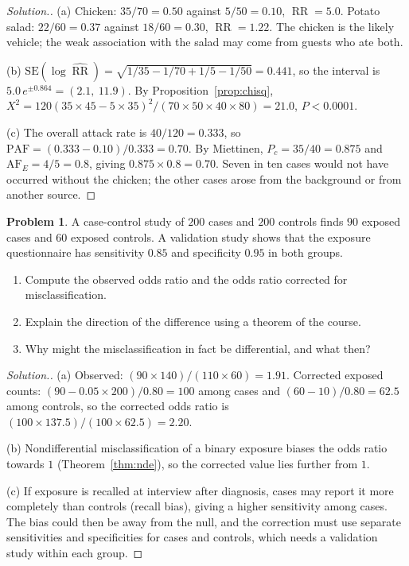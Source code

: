 \documentclass[11pt,a4paper]{article}
\numberwithin{equation}{section}
\DeclareMathOperator{\RR}{RR}
\theoremstyle{definition}
\newtheorem{problemx}{Problem}[subsection]
\newenvironment{problem}{\begin{problemx}}{\end{problemx}}
\newenvironment{solution}
  {\renewcommand{\qedsymbol}{}\begin{proof}[\textit{Solution}.]}
  {\end{proof}}
\begin{document}
\begin{solution}
(a) Chicken: $35/70 = 0.50$ against $5/50 = 0.10$, $\RR = 5.0$. Potato salad: $22/60 = 0.37$ against $18/60 = 0.30$, $\RR = 1.22$. The chicken is the likely
vehicle; the weak association with the salad may come from guests who ate both.

(b) $\text{SE}(\log\widehat{\RR}) = \sqrt{1/35 - 1/70 + 1/5 - 1/50} = 0.441$, so the interval is $5.0\,e^{\pm 0.864} = (2.1,\ 11.9)$. By Proposition~\ref{prop:chisq},
$X^2 = 120(35 \times 45 - 5 \times 35)^2/(70 \times 50 \times 40 \times 80) = 21.0$, $P < 0.0001$.

(c) The overall attack rate is $40/120 = 0.333$, so $\text{PAF} = (0.333 - 0.10)/0.333 = 0.70$. By Miettinen, $P_c = 35/40 = 0.875$ and $\text{AF}_E = 4/5 = 0.8$, giving $0.875 \times 0.8 = 0.70$.
Seven in ten cases would not have occurred without the chicken; the other cases arose from the background or from another source.
\end{solution}

\begin{problem}
A case-control study of $200$ cases and $200$ controls finds $90$ exposed cases and $60$ exposed controls. A validation study shows that the
exposure questionnaire has sensitivity $0.85$ and specificity $0.95$ in both groups.
\begin{enumerate}[label=(\alph*)]
\item Compute the observed odds ratio and the odds ratio corrected for misclassification.
\item Explain the direction of the difference using a theorem of the course.
\item Why might the misclassification in fact be differential, and what then?
\end{enumerate}
\end{problem}

\begin{solution}
(a) Observed: $(90 \times 140)/(110 \times 60) = 1.91$. Corrected exposed counts: $(90 - 0.05 \times 200)/0.80 = 100$ among cases and $(60 - 10)/0.80 = 62.5$ among controls,
so the corrected odds ratio is $(100 \times 137.5)/(100 \times 62.5) = 2.20$.

(b) Nondifferential misclassification of a binary exposure biases the odds ratio towards $1$ (Theorem~\ref{thm:nde}), so the corrected value
lies further from $1$.

(c) If exposure is recalled at interview after diagnosis, cases may report it more completely than controls (recall bias), giving a
higher sensitivity among cases. The bias could then be away from the null, and the correction must use separate sensitivities and
specificities for cases and controls, which needs a validation study within each group.
\end{solution}
\end{document}

